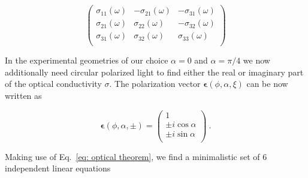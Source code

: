 \documentclass[twocolumn,prb,twocolumn,amsmath,superscriptaddress,nofootinbib,amssymb]{revtex4-1}
\newcommand{\vect}[1]{\boldsymbol{#1}}
\begin{document}
\begin{widetext}
\begin{equation}
\left(
\begin{array}{ccc}
\sigma _{11}(\omega) & -\sigma _{21}(\omega) & -\sigma _{31}(\omega) \\
\sigma _{21}(\omega) & \sigma _{22}(\omega) & -\sigma _{32}(\omega) \\
\sigma _{31}(\omega) & \sigma _{32}(\omega) & \sigma _{33}(\omega) \\
\end{array}
\right)
\end{equation}

In the experimental geometries of our choice $\alpha=0$ and $\alpha=\pi/4$ we now additionally need circular polarized light to find either the real or imaginary part of the optical conductivity $\sigma$. The polarization vector $\vect{\epsilon}(\phi,\alpha,\xi)$ can be now written as

\begin{equation}
\vect{\epsilon}(\phi,\alpha,\pm)=\left(
                  \begin{array}{c}
                    1  \\
                    \pm i\cos\alpha  \\
                    \pm i\sin\alpha  \\
                  \end{array}\right)~.
\end{equation}

Making use of Eq.~\ref{eq: optical theorem}, we find a minimalistic set of 6 independent linear equations


\end{widetext}
\end{document}
